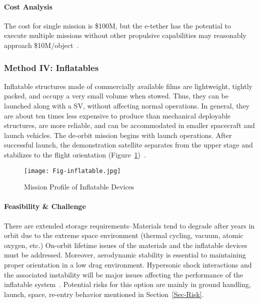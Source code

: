 \documentclass{mcmthesis}
\begin{document}
	\paragraph{Cost Analysis}
	
	The cost for single mission is \$100M, but the e-tether has the potential to execute multiple missions without other propulsive capabilities may reasonably approach \$10M/object~\cite{McKnight}.
	
	\subsubsection{Method IV: Inflatables}
	
	Inflatable structures made of commercially available films are lightweight, tightly packed, and occupy a very small volume when stowed. Thus, they can be launched along with a SV, without affecting normal operations. In general, they are about ten times less expensive to produce than mechanical deployable structures, are more reliable, and can be accommodated in smaller spacecraft and launch vehicles. The de-orbit mission begins with launch operations. After successful launch, the demonstration satellite separates from the upper stage and stabilizes to the flight orientation (Figure~\ref{Fig-Inflatable})~\cite{Beckett}.
	
	\begin{figure}[htbp]
		\centering
		\texttt{[image: Fig-inflatable.jpg]}
		\caption{Mission Profile of Inflatable Devices~\cite{Beckett}}
		\label{Fig-Inflatable}
	\end{figure}
	
	\paragraph{Feasibility \& Challenge}
	
	There are extended storage requirements--Materials tend to degrade after years in orbit due to the extreme space environment (thermal cycling, vacuum, atomic oxygen, etc.) On-orbit lifetime issues of the materials and the inflatable devices must be addressed. Moreover, aerodynamic stability is essential to maintaining proper orientation in a low drag environment. Hypersonic shock interactions and the associated instability will be major issues affecting the performance of the inflatable system~\cite{Beckett}. Potential risks for this option are mainly in ground handling, launch, space, re-entry behavior mentioned in Section~\ref{Sec-Risk}.
	
\end{document}

